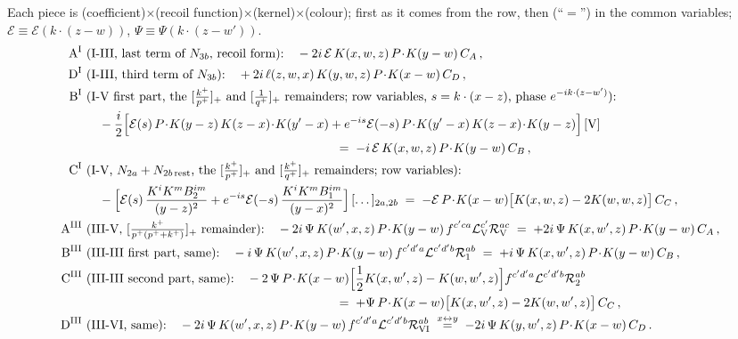 \documentclass[10pt]{article}
\begin{document}
\noindent Each piece is (coefficient)$\times$(recoil function)$\times$(kernel)$\times$(colour); first as it comes from the row, then (``$=$'') in the common variables; $\mathcal{E}\equiv\mathcal{E}(k\cdot(z-w))$, $\Psi\equiv\Psi(k\cdot(z-w'))$.
\begin{align}
\text{A}^{\rm I}\ &\text{(I-III, last term of $N_{3b}$, recoil form):}\quad -2i\,\mathcal{E}\,K(x,w,z)\,P\!\cdot\!K(y-w)\,C_{A}\,,\notag\\
\text{D}^{\rm I}\ &\text{(I-III, third term of $N_{3b}$):}\quad +2i\,\ell(z,w,x)\,K(y,w,z)\,P\!\cdot\!K(x-w)\,C_{D}\,,\notag\\
\text{B}^{\rm I}\ &\text{(I-V first part, the $[\tfrac{k^{+}}{p^{+}}]_{+}$ and $[\tfrac{1}{q^{+}}]_{+}$ remainders; row variables, $s=k\cdot(x-z)$, phase $e^{-ik\cdot(z-w')}$):}\notag\\
&\quad-\frac{i}{2}\Big[\mathcal{E}(s)\,P\!\cdot\!K(y-z)\,K(z-x)\!\cdot\!K(y'-x)+e^{-is}\mathcal{E}(-s)\,P\!\cdot\!K(y'-x)\,K(z-x)\!\cdot\!K(y-z)\Big]\,[\text{V}]\notag\\
&\hspace{20em}=\;-i\,\mathcal{E}\,K(x,w,z)\,P\!\cdot\!K(y-w)\,C_{B}\,,\notag\\
\text{C}^{\rm I}\ &\text{(I-V, $N_{2a}+N_{2b\,\rm rest}$, the $[\tfrac{k^{+}}{p^{+}}]_{+}$ and $[\tfrac{k^{+}}{q^{+}}]_{+}$ remainders; row variables):}\notag\\
&\quad-\Big[\mathcal{E}(s)\,\frac{K^{i}K^{m}B_{2}^{im}}{(y-z)^{2}}+e^{-is}\mathcal{E}(-s)\,\frac{K^{i}K^{m}B_{1}^{im}}{(y-x)^{2}}\Big]\,[\dots]_{2a,2b}
\;=\;-\mathcal{E}\,P\!\cdot\!K(x-w)\big[K(x,w,z)-2K(w,w,z)\big]\,C_{C}\,,\notag\\
\text{A}^{\rm III}\ &\text{(III-V, $[\tfrac{k^{+}}{p^{+}(p^{+}+k^{+})}]_{+}$ remainder):}\quad-2i\,\Psi\,K(w',x,z)\,P\!\cdot\!K(y-w)\,f^{c'ca}\mathcal{L}_{\rm V}^{c'}\mathcal{R}_{\rm V}^{ac}\;=\;+2i\,\Psi\,K(x,w',z)\,P\!\cdot\!K(y-w)\,C_{A}\,,\label{sf:pieces}\\
\text{B}^{\rm III}\ &\text{(III-III first part, same):}\quad-i\,\Psi\,K(w',x,z)\,P\!\cdot\!K(y-w)\,f^{c'd'a}\mathcal{L}^{c'd'b}\mathcal{R}_{1}^{ab}\;=\;+i\,\Psi\,K(x,w',z)\,P\!\cdot\!K(y-w)\,C_{B}\,,\notag\\
\text{C}^{\rm III}\ &\text{(III-III second part, same):}\quad-2\,\Psi\,P\!\cdot\!K(x-w)\Big[\frac12K(x,w',z)-K(w,w',z)\Big]f^{c'd'a}\mathcal{L}^{c'd'b}\mathcal{R}_{2}^{ab}\notag\\
&\hspace{20em}=\;+\Psi\,P\!\cdot\!K(x-w)\big[K(x,w',z)-2K(w,w',z)\big]\,C_{C}\,,\notag\\
\text{D}^{\rm III}\ &\text{(III-VI, same):}\quad-2i\,\Psi\,K(w',x,z)\,P\!\cdot\!K(y-w)\,f^{c'd'a}\mathcal{L}^{c'd'b}\mathcal{R}_{\rm VI}^{ab}\;\overset{x\leftrightarrow y}{=}\;-2i\,\Psi\,K(y,w',z)\,P\!\cdot\!K(x-w)\,C_{D}\,.\notag
\end{align}
\end{document}
